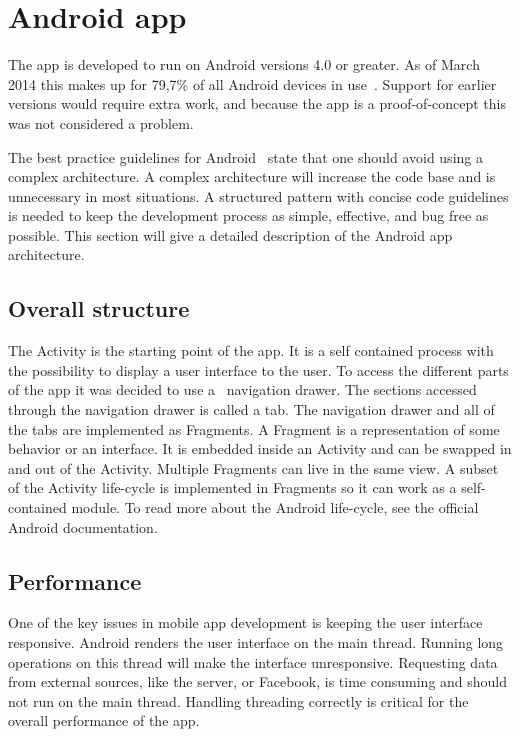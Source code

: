 \section{Android app}
\label{sec:arch_app}
The app is developed to run on Android versions 4.0 or greater. As of March 2014 this makes up for 79,7\% of all Android devices in use~\cite{AndroidDeviceFragmentation}.
Support for earlier versions would require extra work, and because the app is a proof-of-concept this was not considered a problem.

The best practice guidelines for Android~\cite{androidPracticePerformance} state that one should avoid using a complex architecture. A complex architecture will increase the code base and is unnecessary in most situations. A structured pattern with concise code guidelines is needed to keep the development process as simple, effective, and bug free as possible. This section will give a detailed description of the Android app architecture. 

\subsection{Overall structure}
The Activity is the starting point of the app. It is a self contained process with the possibility to display a user interface to the user. To access the different parts of the app it was decided to use a ~\gls{navigation drawer}. The sections accessed through the navigation drawer is called a tab. The navigation drawer and all of the tabs are implemented as Fragments. A Fragment is a representation of some behavior or an interface. It is embedded inside an Activity and can be swapped in and out of the Activity. Multiple Fragments can live in the same view. A subset of the Activity life-cycle is implemented in Fragments so it can work as a self-contained module. To read more about the Android life-cycle, see the official Android documentation.~\cite{androiddoc}

\subsection{Performance}
One of the key issues in mobile app development is keeping the user interface responsive. Android renders the user interface on the main thread. Running long operations on this thread will make the interface unresponsive. Requesting data from external sources, like the server, or Facebook, is time consuming and should not run on the main thread. Handling threading correctly is critical for the overall performance of the app.

